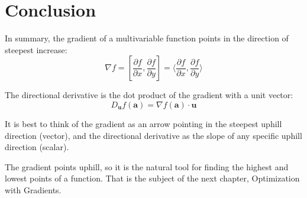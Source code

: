 \section{Conclusion}
In summary, the gradient of a multivariable function points in the direction of steepest increase:
$$\nabla f = \left[ \frac{\partial f}{\partial x}, \frac{\partial f}{
\partial y} \right] = \langle{ \frac{\partial f}{\partial x}, \frac{\partial f}{
\partial y} \rangle}$$

The directional derivative is the dot product of the gradient with a unit vector:
$$
D_{\mathbf{u}} f(\mathbf{a}) = \nabla f(\mathbf{a}) \cdot \mathbf{u}
$$

It is best to think of the gradient as an arrow pointing in the steepest uphill direction (vector), and the directional derivative as the slope of any specific uphill direction (scalar).

The gradient points uphill, so it is the natural tool for finding the highest and lowest points of a
function. That is the subject of the next chapter, Optimization with Gradients.
